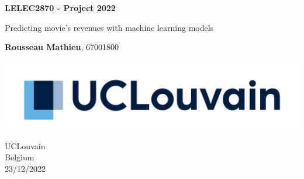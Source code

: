 \begin{titlepage}
	\begin{center}
	  \vspace*{1cm}
		  
	  \Huge
	  \textbf{LELEC2870 - Project 2022}
		  
	  \vspace{0.5cm}
	  \LARGE
	  Predicting movie's revenues with machine learning models
		  
	  \vspace{2.5cm}
	  
	  \Large
	  \textbf{Rousseau Mathieu}, 67001800
		  
	  \vfill
		  
	  \vspace{0.8cm}
		  
	  \includegraphics[width=\textwidth]{figures/logo_ucl.png}
  
	  \vspace{0.8cm}
		  
	  \Large
	  UCLouvain \\
	  Belgium \\
	  23/12/2022
	\end{center}
  \end{titlepage}